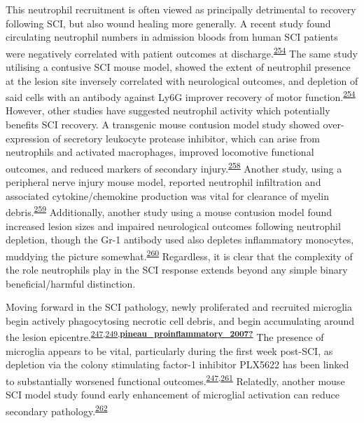 \documentclass[
]{article}
\begin{document}
This neutrophil recruitment is often viewed as principally detrimental to recovery following SCI, but also wound healing more generally.
A recent study found circulating neutrophil numbers in admission bloods from human SCI patients were negatively correlated with patient outcomes at discharge.\textsuperscript{\protect\hyperlink{ref-brennan_complement_2019}{254}}
The same study utilising a contusive SCI mouse model, showed the extent of neutrophil presence at the lesion site inversely correlated with neurological outcomes, and depletion of said cells with an antibody against Ly6G improver recovery of motor function.\textsuperscript{\protect\hyperlink{ref-brennan_complement_2019}{254}}
However, other studies have suggested neutrophil activity which potentially benefits SCI recovery.
A transgenic mouse contusion model study showed over-expression of secretory leukocyte protease inhibitor, which can arise from neutrophils and activated macrophages, improved locomotive functional outcomes, and reduced markers of secondary injury.\textsuperscript{\protect\hyperlink{ref-ghasemlou_beneficial_2010}{258}}
Another study, using a peripheral nerve injury mouse model, reported neutrophil infiltration and associated cytokine/chemokine production was vital for clearance of myelin debris.\textsuperscript{\protect\hyperlink{ref-lindborg_neutrophils_2017}{259}}
Additionally, another study using a mouse contusion model found increased lesion sizes and impaired neurological outcomes following neutrophil depletion, though the Gr-1 antibody used also depletes inflammatory monocytes, muddying the picture somewhat.\textsuperscript{\protect\hyperlink{ref-stirling_depletion_2009}{260}}
Regardless, it is clear that the complexity of the role neutrophils play in the SCI response extends beyond any simple binary beneficial/harmful distinction.

Moving forward in the SCI pathology, newly proliferated and recruited microglia begin actively phagocytosing necrotic cell debris, and begin accumulating around the lesion epicentre.\textsuperscript{\protect\hyperlink{ref-bellver-landete_microglia_2019}{247},\protect\hyperlink{ref-greenhalgh_differences_2014}{249},\protect\hyperlink{ref-pineau_proinflammatory_2007}{\textbf{pineau\_proinflammatory\_2007?}}}
The presence of microglia appears to be vital, particularly during the first week post-SCI, as depletion via the colony stimulating factor-1 inhibitor PLX5622 has been linked to substantially worsened functional outcomes.\textsuperscript{\protect\hyperlink{ref-bellver-landete_microglia_2019}{247},\protect\hyperlink{ref-brennan_microglia_2018}{261}}
Relatedly, another mouse SCI model study found early enhancement of microglial activation can reduce secondary pathology.\textsuperscript{\protect\hyperlink{ref-stirling_toll-like_2014}{262}}
\end{document}
